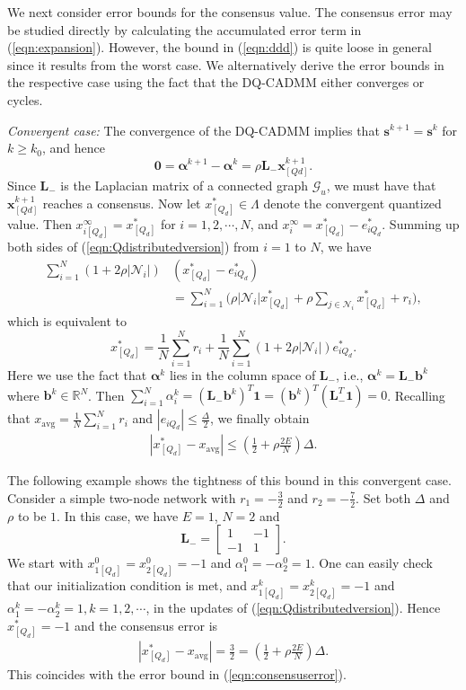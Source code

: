 \documentclass[journal]{IEEEtran}
\newcommand{\nn}{\nonumber}
\begin{document}
\begin{IEEEproof}
We next consider error bounds for the consensus value. The consensus error may be studied directly by calculating the accumulated error term in (\ref{eqn:expansion}). However, the bound in (\ref{eqn:ddd}) is quite loose in general since it results from the worst case. We alternatively derive the error bounds in the respective case using the fact that the DQ-CADMM either converges or cycles.

\emph{Convergent case:} The convergence of the DQ-CADMM implies that $\bm s^{k+1}=\bm s^k$ for $k\geq k_0$, and hence 
$$\bm 0 = \bm\alpha^{k+1}-\bm\alpha^k=\rho\bm L_-\bm x^{k+1}_{[Qd]}.$$
Since $\bm L_-$ is the Laplacian matrix of a connected graph $\mathcal{G}_u$, we must have that $\bm x^{k+1}_{[Qd]}$ reaches a consensus. Now let $x_{[Q_d]}^*\in\Lambda$ denote the convergent quantized value. Then $x_{i[Q_d]}^\infty=x_{[Q_d]}^*$ for $i = 1,2,\cdots,N$, and $x_i^\infty=x_{[Q_d]}^*-e_{iQ_d}^*$. Summing up both sides of (\ref{eqn:Qdistributedversion}) from $i = 1$ to $N$, we have 
\begin{align}
\sum_{i=1}^N (1+2\rho|\mathcal{N}_i|)&\left(x_{[Q_d]}^*-e_{iQ_d}^*\right)\nn\\&= \sum_{i=1}^N\bigg(\rho|\mathcal{N}_i| x_{[Q_d]}^*+\rho\sum_{j\in\mathcal{N}_i} x_{[Q_d]}^*+r_i\bigg),\nn
\end{align}
which is equivalent to 
$$x^*_{[Q_d]} = \frac{1}{N}\sum_{i=1}^N r_i + \frac{1}{N}\sum_{i=1}^N (1+2\rho|\mathcal{N}_i|) e_{iQ_d}^*.$$
Here we use the fact that $\bm \alpha^k$ lies in the column space of $\bm L_-$, i.e.,  $\bm \alpha^k=\bm L_-\bm b^k$ where $\bm b^k\in\mathbb{R}^N$. Then $\sum_{i=1}^N \alpha^k_i = (\bm L_-\bm b^k)^T\bm 1=(\bm b^k)^T(\bm L_-^T\bm 1)=0$.
Recalling that $x_\text{avg} = \frac{1}{N}\sum_{i=1}^N r_i$ and $|e_{iQ_d}|\leq\frac{\Delta}{2}$, we finally obtain
\begin{align}
\left|x^*_{[Q_d]}-x_\text{avg}\right|\leq \left(\frac{1}{2}+\rho\frac{2E}{N}\right)\Delta.\nn
\end{align}

The following example shows the tightness of this bound in this convergent case. Consider a simple two-node network with $r_1=-\frac{3}{2}$ and $ r_2=-\frac{7}{2}$. Set both $\Delta$ and $\rho$ to be $1$. In this case, we have $E=1$, $N=2$ and $$\bm L_-=\begin{bmatrix} 1& -1\\ -1& 1\end{bmatrix}.$$ We start with $x^0_{1[Q_d]}=x^0_{2[Q_d]}=-1$ and $\alpha_1^0= -\alpha_2^0=1$. One can easily check that our initialization condition is met, and $x^k_{1[Q_d]}= x^k_{2[Q_d]}=-1$ and $\alpha_1^k= -\alpha_2^k=1, k = 1,2,\cdots$, in the updates of (\ref{eqn:Qdistributedversion}). Hence $x^*_{[Q_d]}=-1$ and the consensus error is 
\begin{align}
\left |x_{[Q_d]}^*-x_\text{avg}\right |=\frac{3}{2}=\left(\frac{1}{2}+\rho\frac{2E}{N}\right)\Delta.\nn
\end{align}
This coincides with the error bound in (\ref{eqn:consensuserror}).


\end{IEEEproof}
\end{document}
